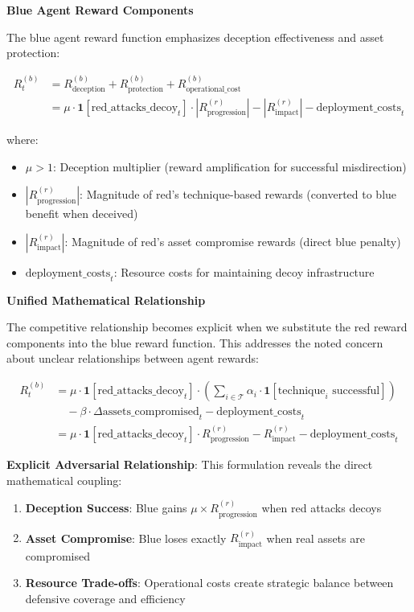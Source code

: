 \documentclass[12pt,oneside]{article}
\begin{document}
\textbf{Blue Agent Reward Components}

The blue agent reward function emphasizes deception effectiveness and asset protection:

\begin{align}
R^{(b)}_t &= R^{(b)}_{\text{deception}} + R^{(b)}_{\text{protection}} + R^{(b)}_{\text{operational\_cost}} \\
&= \mu \cdot \mathbf{1}[\text{red\_attacks\_decoy}_t] \cdot |R^{(r)}_{\text{progression}}| - |R^{(r)}_{\text{impact}}| - \text{deployment\_costs}_t
\end{align}

where:
\begin{itemize}
    \item $\mu > 1$: Deception multiplier (reward amplification for successful misdirection)
    \item $|R^{(r)}_{\text{progression}}|$: Magnitude of red's technique-based rewards (converted to blue benefit when deceived)
    \item $|R^{(r)}_{\text{impact}}|$: Magnitude of red's asset compromise rewards (direct blue penalty)
    \item $\text{deployment\_costs}_t$: Resource costs for maintaining decoy infrastructure
\end{itemize}

\textbf{Unified Mathematical Relationship}

The competitive relationship becomes explicit when we substitute the red reward components into the blue reward function. This addresses the noted concern about unclear relationships between agent rewards:

\begin{align}
R^{(b)}_t &= \mu \cdot \mathbf{1}[\text{red\_attacks\_decoy}_t] \cdot \left(\sum_{i \in \mathcal{T}} \alpha_i \cdot \mathbf{1}[\text{technique}_i \text{ successful}]\right) \\
&\quad - \beta \cdot \Delta\text{assets\_compromised}_t - \text{deployment\_costs}_t \\
&= \mu \cdot \mathbf{1}[\text{red\_attacks\_decoy}_t] \cdot R^{(r)}_{\text{progression}} - R^{(r)}_{\text{impact}} - \text{deployment\_costs}_t
\end{align}

\textbf{Explicit Adversarial Relationship}: This formulation reveals the direct mathematical coupling:
\begin{enumerate}
    \item \textbf{Deception Success}: Blue gains $\mu \times R^{(r)}_{\text{progression}}$ when red attacks decoys
    \item \textbf{Asset Compromise}: Blue loses exactly $R^{(r)}_{\text{impact}}$ when real assets are compromised  
    \item \textbf{Resource Trade-offs}: Operational costs create strategic balance between defensive coverage and efficiency
\end{enumerate}
\end{document}
